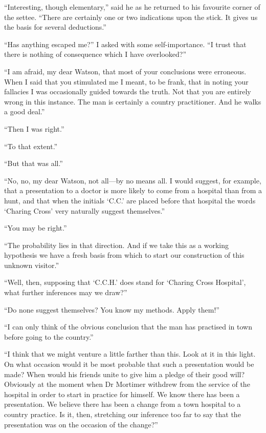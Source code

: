 \documentclass[paper=a5,BCOR=7mm,twoside,DIV=calc,12pt,usegeometry,openany,chapterprefix,endperiod,headings=big]{scrbook} %
\begin{document}
\enquote{Interesting, though elementary,} said he as he returned to his favourite corner of the settee. \enquote{There are certainly one or two indications upon the stick. It gives us the basis for several deductions.}

\enquote{Has anything escaped me?} I asked with some self-importance. \enquote{I trust that there is nothing of consequence which I have overlooked?}

\enquote{I am afraid, my dear Watson, that most of your conclusions were erroneous. When I said that you stimulated me I meant, to be frank, that in noting your fallacies I was occasionally guided towards the truth. Not that you are entirely wrong in this instance. The man is certainly a country practitioner. And he walks a good deal.}

\enquote{Then I was right.}

\enquote{To that extent.}

\enquote{But that was all.}

\enquote{No, no, my dear Watson, not all---by no means all. I would suggest, for example, that a presentation to a doctor is more likely to come from a hospital than from a hunt, and that when the initials \enquote{C.C.} are placed before that hospital the words \enquote{Charing Cross} very naturally suggest themselves.}

\enquote{You may be right.}

\enquote{The probability lies in that direction. And if we take this as a working hypothesis we have a fresh basis from which to start our construction of this unknown visitor.}

\enquote{Well, then, supposing that \enquote{C.C.H.} does stand for \enquote{Charing Cross Hospital}, what further inferences may we draw?}

\enquote{Do none suggest themselves? You know my methods. Apply them!}

\enquote{I can only think of the obvious conclusion that the man has practised in town before going to the country.}

\enquote{I think that we might venture a little farther than this. Look at it in this light. On what occasion would it be most probable that such a presentation would be made? When would his friends unite to give him a pledge of their good will? Obviously at the moment when Dr Mortimer withdrew from the service of the hospital in order to start in practice for himself. We know there has been a presentation. We believe there has been a change from a town hospital to a country practice. Is it, then, stretching our inference too far to say that the presentation was on the occasion of the change?}
\end{document}
